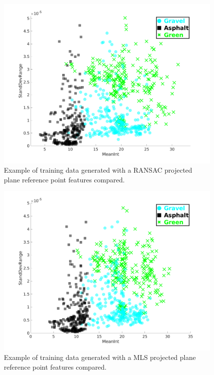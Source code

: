 \documentclass[numbered,pdftex]{ohio-etd}
\begin{document}
{{{		\begin{figure}[H]
			\centering
			\includegraphics[width=0.65\linewidth]{Defense_Images/ransac_training_data_cluster}
			\caption[Example RANSAC Clustering]{Example of training data generated with a RANSAC projected plane reference point features compared.}
			\label{fig:ransac_training_data_cluster}
		\end{figure}
	
		\begin{figure}[H]
			\centering
			\includegraphics[width=0.65\linewidth]{Defense_Images/mls_training_data_cluster}
			\caption[Example MLS Clustering]{Example of training data generated with a MLS projected plane reference point features compared.}
			\label{fig:mls_training_data_cluster}
		\end{figure}
	
}}}
\end{document}
